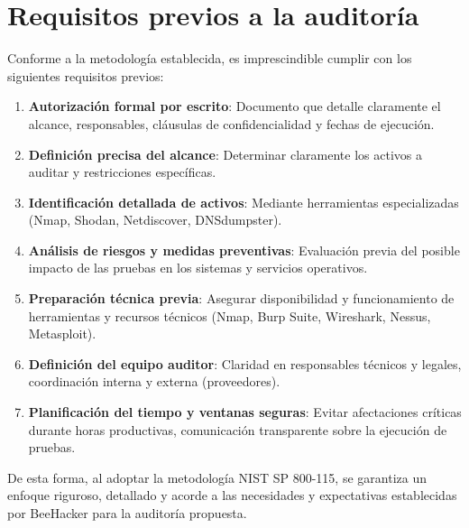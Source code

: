 \documentclass[a4paper, 10pt]{article}
\begin{document}

\section{Requisitos previos a la auditoría}
\par\vspace{0.5cm}
Conforme a la metodología establecida, es imprescindible cumplir con los siguientes requisitos previos:

\begin{enumerate}
\item \textbf{Autorización formal por escrito}: Documento que detalle claramente el alcance, responsables, cláusulas de confidencialidad y fechas de ejecución.
\item \textbf{Definición precisa del alcance}: Determinar claramente los activos a auditar y restricciones específicas.
\item \textbf{Identificación detallada de activos}: Mediante herramientas especializadas (Nmap, Shodan, Netdiscover, DNSdumpster).
\item \textbf{Análisis de riesgos y medidas preventivas}: Evaluación previa del posible impacto de las pruebas en los sistemas y servicios operativos.
\item \textbf{Preparación técnica previa}: Asegurar disponibilidad y funcionamiento de herramientas y recursos técnicos (Nmap, Burp Suite, Wireshark, Nessus, Metasploit).
\item \textbf{Definición del equipo auditor}: Claridad en responsables técnicos y legales, coordinación interna y externa (proveedores).
\item \textbf{Planificación del tiempo y ventanas seguras}: Evitar afectaciones críticas durante horas productivas, comunicación transparente sobre la ejecución de pruebas.
\end{enumerate}

De esta forma, al adoptar la metodología NIST SP 800-115, se garantiza un enfoque riguroso, detallado y acorde a las necesidades y expectativas establecidas por BeeHacker para la auditoría propuesta.
\end{document}
